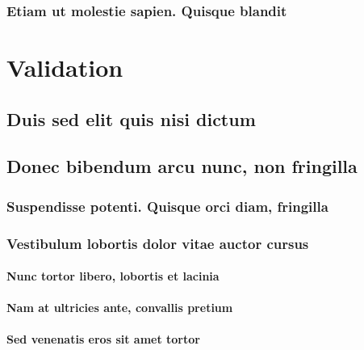 \documentclass[%
  english,%
]{doctorate}
\begin{document}
\lipsum[1-8]

\subsection{Etiam ut molestie sapien. Quisque blandit}

\lipsum[1-8]





\chapter{Validation}

\lipsum[1-8]

\section{Duis sed elit quis nisi dictum}

\lipsum[1-8]

\section{Donec bibendum arcu nunc, non fringilla}

\lipsum[1-8]

\subsection{Suspendisse potenti. Quisque orci diam, fringilla}

\lipsum[1-8]

\subsection{Vestibulum lobortis dolor vitae auctor cursus}

\lipsum[1-8]

\subsubsection{Nunc tortor libero, lobortis et lacinia}

\lipsum[1-8]

\subsubsection{Nam at ultricies ante, convallis pretium}

\lipsum[1-8]

\subsubsection{Sed venenatis eros sit amet tortor}
\end{document}
